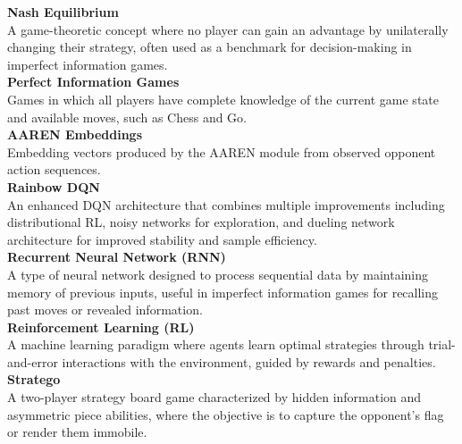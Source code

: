 \noindent\textbf{Nash Equilibrium} \\
A game-theoretic concept where no player can gain an advantage by unilaterally changing their strategy, often used as a benchmark for decision-making in imperfect information games. \\[6pt]

\noindent\textbf{Perfect Information Games} \\
Games in which all players have complete knowledge of the current game state and available moves, such as Chess and Go. \\[6pt]

\noindent\textbf{AAREN Embeddings} \\
Embedding vectors produced by the AAREN module from observed opponent action sequences. \\[6pt]

\noindent\textbf{Rainbow DQN} \\
An enhanced DQN architecture that combines multiple improvements including distributional RL, noisy networks for exploration, and dueling network architecture for improved stability and sample efficiency. \\[6pt]

\noindent\textbf{Recurrent Neural Network (RNN)} \\
A type of neural network designed to process sequential data by maintaining memory of previous inputs, useful in imperfect information games for recalling past moves or revealed information. \\[6pt]

\noindent\textbf{Reinforcement Learning (RL)} \\
A machine learning paradigm where agents learn optimal strategies through trial-and-error interactions with the environment, guided by rewards and penalties. \\[6pt]

\noindent\textbf{Stratego} \\
A two-player strategy board game characterized by hidden information and asymmetric piece abilities, where the objective is to capture the opponent's flag or render them immobile. \\[6pt]